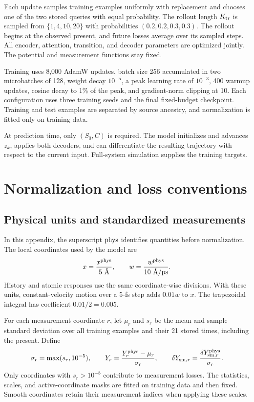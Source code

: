 \documentclass[11pt,a4paper]{article}
\numberwithin{equation}{section}
\newcommand{\sm}{\mathrm{sm}}
\begin{document}
Each update samples training examples uniformly with replacement and chooses
one of the two stored queries with equal probability. The rollout length
$K_{\rm tr}$ is sampled from $\{1,4,10,20\}$ with probabilities
$(0.2,0.2,0.3,0.3)$. The rollout begins at the observed present, and future
losses average over its sampled steps. All encoder, attention, transition,
and decoder parameters are optimized jointly. The potential and measurement
functions stay fixed.

Training uses 8,000 AdamW updates, batch size 256 accumulated in two
microbatches of 128, weight decay $10^{-5}$, a peak learning rate of $10^{-3}$,
400 warmup updates, cosine decay to 1\% of the peak, and gradient-norm clipping
at 10. Each configuration uses three training seeds and the final fixed-budget
checkpoint. Training and test examples are separated by source ancestry,
and normalization is fitted only on training data.

At prediction time, only $(S_0,C)$ is required. The model initializes and
advances $z_k$, applies both decoders, and can differentiate the resulting
trajectory with respect to the current input. Full-system simulation supplies
the training targets.

\clearpage
\appendix
\section{Normalization and loss conventions}
\label{app:normalization}

\subsection{Physical units and standardized measurements}

In this appendix, the superscript $\rm phys$ identifies quantities before
normalization. The local coordinates used by the model are
\begin{equation}
x=\frac{x^{\rm phys}}{5\ \text{\AA}},\qquad
w=\frac{w^{\rm phys}}{10\ \text{\AA/ps}}.
\end{equation}
History and atomic responses use the same coordinate-wise divisions.
With these units, constant-velocity motion over a 5-fs step adds $0.01w$
to $x$. The trapezoidal integral has coefficient $0.01/2=0.005$.

For each measurement coordinate $r$, let $\mu_r$ and $s_r$ be the mean and
sample standard deviation over all training examples and their 21 stored
times, including the present. Define
\begin{equation}
\sigma_r=\max(s_r,10^{-5}),\qquad
Y_r=\frac{Y_r^{\rm phys}-\mu_r}{\sigma_r},\qquad
\delta Y_{\sm,r}=\frac{\delta Y_{\sm,r}^{\rm phys}}{\sigma_r}.
\end{equation}
Only coordinates with $s_r>10^{-8}$ contribute to measurement losses.
The statistics, scales, and active-coordinate masks are fitted on training
data and then fixed. Smooth coordinates retain their measurement indices
when applying these scales.
\end{document}
